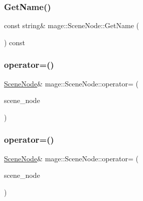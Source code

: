 \hypertarget{classmage_1_1_scene_node_ab4d72e26370747c06ccb1461f3080b31}{}\label{classmage_1_1_scene_node_ab4d72e26370747c06ccb1461f3080b31} 
\subsubsection{\texorpdfstring{Get\+Name()}{GetName()}}
{\footnotesize\ttfamily const string\& mage\+::\+Scene\+Node\+::\+Get\+Name (\begin{DoxyParamCaption}{ }\end{DoxyParamCaption}) const\hspace{0.3cm}{\ttfamily [noexcept]}}

\hypertarget{classmage_1_1_scene_node_af4298cbc808139f9da43055afdfe8f7e}{}\label{classmage_1_1_scene_node_af4298cbc808139f9da43055afdfe8f7e} 
\subsubsection{\texorpdfstring{operator=()}{operator=()}\hspace{0.1cm}{\footnotesize\ttfamily [1/2]}}
{\footnotesize\ttfamily \hyperlink{classmage_1_1_scene_node}{Scene\+Node}\& mage\+::\+Scene\+Node\+::operator= (\begin{DoxyParamCaption}\item[{const \hyperlink{classmage_1_1_scene_node}{Scene\+Node} \&}]{scene\+\_\+node }\end{DoxyParamCaption})\hspace{0.3cm}{\ttfamily [delete]}}

\hypertarget{classmage_1_1_scene_node_ae38092ba9ec8449f15b3c1f8285ba500}{}\label{classmage_1_1_scene_node_ae38092ba9ec8449f15b3c1f8285ba500} 
\subsubsection{\texorpdfstring{operator=()}{operator=()}\hspace{0.1cm}{\footnotesize\ttfamily [2/2]}}
{\footnotesize\ttfamily \hyperlink{classmage_1_1_scene_node}{Scene\+Node}\& mage\+::\+Scene\+Node\+::operator= (\begin{DoxyParamCaption}\item[{\hyperlink{classmage_1_1_scene_node}{Scene\+Node} \&\&}]{scene\+\_\+node }\end{DoxyParamCaption})\hspace{0.3cm}{\ttfamily [delete]}}

